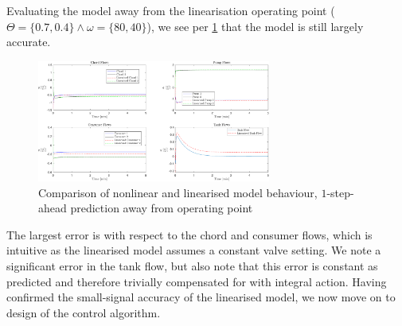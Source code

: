 Evaluating the model away from the linearisation operating point ($\Theta = \{0.7,0.4\} \wedge \omega = \{80,40\}$), we see per \cref{fig:CompNonLinNotEQ} that the model is still largely accurate.

\begin{figure}[h]
	\centering
	\includegraphics[height=4cm,width=\linewidth]{Graphics/DifferentOPFlows.pdf}
	\caption{Comparison of nonlinear and linearised model behaviour, $1$-step-ahead prediction away from operating point}
	\label{fig:CompNonLinNotEQ}
\end{figure}

The largest error is with respect to the chord and consumer flows, which is intuitive as the linearised model assumes a constant valve setting. We note a significant error in the tank flow, but also note that this error is constant as predicted and therefore trivially compensated for with integral action. Having confirmed the small-signal accuracy of the linearised model, we now move on to design of the control algorithm.